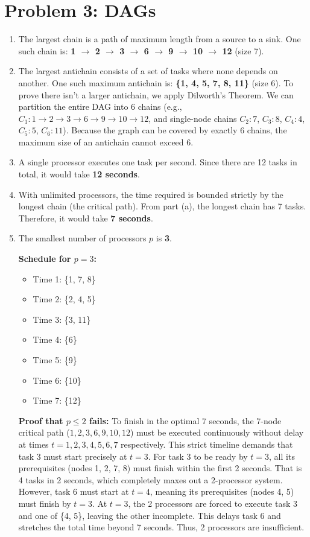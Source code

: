 \documentclass[11pt]{article}
\begin{document}
\newpage

\section*{Problem 3: DAGs}

\begin{enumerate}[label=\textbf{(\alph*)}]
    \item The largest chain is a path of maximum length from a source to a sink. One such chain is: \textbf{1 $\to$ 2 $\to$ 3 $\to$ 6 $\to$ 9 $\to$ 10 $\to$ 12} (size 7).
    
    \item The largest antichain consists of a set of tasks where none depends on another. One such maximum antichain is: \textbf{\{1, 4, 5, 7, 8, 11\}} (size 6).
    To prove there isn't a larger antichain, we apply Dilworth's Theorem. We can partition the entire DAG into 6 chains (e.g., $C_1: 1 \to 2 \to 3 \to 6 \to 9 \to 10 \to 12$, and single-node chains $C_2: 7$, $C_3: 8$, $C_4: 4$, $C_5: 5$, $C_6: 11$). Because the graph can be covered by exactly 6 chains, the maximum size of an antichain cannot exceed 6.
    
    \item A single processor executes one task per second. Since there are 12 tasks in total, it would take \textbf{12 seconds}.
    
    \item With unlimited processors, the time required is bounded strictly by the longest chain (the critical path). From part (a), the longest chain has 7 tasks. Therefore, it would take \textbf{7 seconds}.
    
    \item The smallest number of processors $p$ is \textbf{3}. 
    
    \textbf{Schedule for $p=3$:}
    \begin{itemize}
        \item Time 1: \{1, 7, 8\}
        \item Time 2: \{2, 4, 5\}
        \item Time 3: \{3, 11\}
        \item Time 4: \{6\}
        \item Time 5: \{9\}
        \item Time 6: \{10\}
        \item Time 7: \{12\}
    \end{itemize}
    \textbf{Proof that $p \le 2$ fails:} To finish in the optimal 7 seconds, the 7-node critical path ($1,2,3,6,9,10,12$) must be executed continuously without delay at times $t=1, 2, 3, 4, 5, 6, 7$ respectively. This strict timeline demands that task 3 must start precisely at $t=3$. For task 3 to be ready by $t=3$, all its prerequisites (nodes 1, 2, 7, 8) must finish within the first 2 seconds. That is 4 tasks in 2 seconds, which completely maxes out a 2-processor system. 
    However, task 6 must start at $t=4$, meaning its prerequisites (nodes 4, 5) must finish by $t=3$. At $t=3$, the 2 processors are forced to execute task 3 and one of \{4, 5\}, leaving the other incomplete. This delays task 6 and stretches the total time beyond 7 seconds. Thus, 2 processors are insufficient.
    

\end{enumerate}
\end{document}
